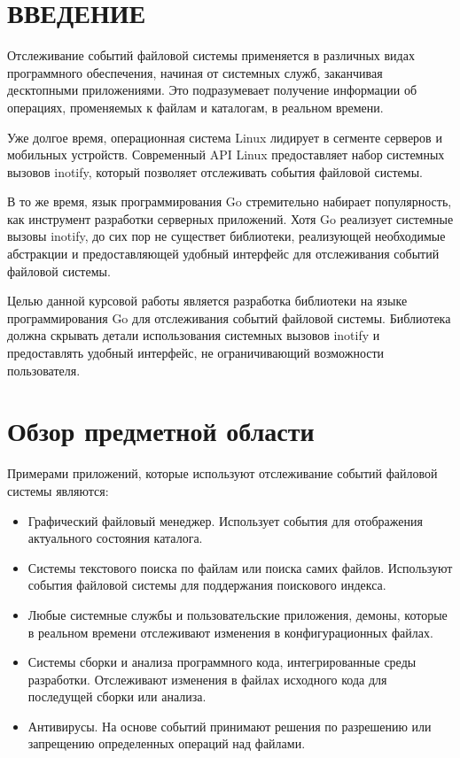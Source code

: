 \documentclass[14pt, russian]{scrartcl}
\newcommand{\anonsection}[1]{\cleardoublepage
\phantomsection
\addcontentsline{toc}{section}{\protect\numberline{}#1}
\section*{#1}\vspace*{2.5ex} %
}
\begin{document}

\setlength{\tabcolsep}{3pt}
\newpage
\setcounter{page}{2}

\newpage
\renewcommand\contentsname{\hfill{\normalfont{СОДЕРЖАНИЕ}}\hfill}  %
\tableofcontents
\newpage
\anonsection{ВВЕДЕНИЕ}  %

Отслеживание событий файловой системы применяется в различных видах программного
обеспечения, начиная от системных служб, заканчивая десктопными приложениями.
Это подразумевает получение информации об операциях, променяемых к файлам и
каталогам, в реальном времени.

Уже долгое время, операционная система Linux лидирует в сегменте серверов и
мобильных устройств. Современный API Linux предоставляет набор системных вызовов
inotify, который позволяет отслеживать события файловой системы.

В то же время, язык программирования Go стремительно набирает популярность, как
инструмент разработки серверных приложений. Хотя Go реализует системные вызовы
inotify, до сих пор не существет библиотеки, реализующей необходимые абстракции
и предоставляющей удобный интерфейс для отслеживания событий файловой системы.

Целью данной курсовой работы является разработка библиотеки на языке
программирования Go для отслеживания событий файловой системы. Библиотека должна
скрывать детали использования системных вызовов inotify и предоставлять удобный
интерфейс, не ограничивающий возможности пользователя.

\section{Обзор предметной области}

Примерами приложений, которые используют отслеживание событий файловой системы
являются:

\begin{itemize}
  \item Графический файловый менеджер. Использует события для отображения
        актуального состояния каталога.
  \item Системы текстового поиска по файлам или поиска самих файлов. Используют
        события файловой системы для поддержания поискового индекса.
  \item Любые системные службы и пользовательские приложения, демоны, которые в
        реальном времени отслеживают изменения в конфигурационных файлах.
  \item Системы сборки и анализа программного кода, интегрированные среды
        разработки. Отслеживают изменения в файлах исходного кода для последущей
        сборки или анализа.
  \item Антивирусы. На основе событий принимают решения по разрешению или
        запрещению определенных операций над файлами.
\end{itemize}
\end{document}
